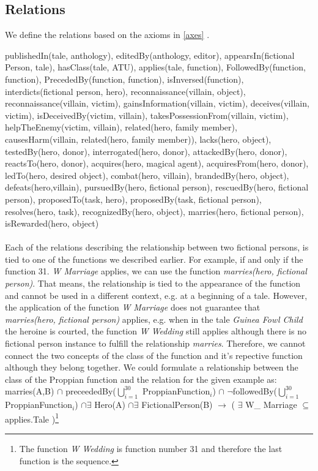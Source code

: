 \documentclass[10pt,a4paper]{article}
\begin{document}
\subsection{Relations}
We define the relations based on the axioms in \ref{axes} . 

publishedIn(tale, anthology), editedBy(anthology, editor), appearsIn(fictional Person, tale), hasClass(tale, ATU), applies(tale, function), FollowedBy(function, function), PrecededBy(function, function), isInversed(function), interdicts(fictional person, hero), reconnaissance(villain, object), reconnaissance(villain, victim), gainsInformation(villain, victim), deceives(villain, victim), isDeceivedBy(victim, villain), takesPossessionFrom(villain, victim), helpTheEnemy(victim, villain), related(hero, family member), causesHarm(villain, related(hero, family member)), lacks(hero, object), testedBy(hero, donor), interrogated(hero, donor), attackedBy(hero, donor), reactsTo(hero, donor), acquires(hero, magical agent), acquiresFrom(hero, donor), ledTo(hero, desired object), combat(hero, villain), brandedBy(hero, object), defeats(hero,villain), pursuedBy(hero, fictional person), rescuedBy(hero, fictional person), proposedTo(task, hero), proposedBy(task, fictional person), resolves(hero, task), recognizedBy(hero, object), marries(hero, fictional person), isRewarded(hero, object)
\\ \\
Each of the relations describing the relationship between two fictional persons, is tied to one of the functions we described earlier. For example, if and only if the function 31. \textit{W Marriage} applies, we can use the function \textit{marries(hero, fictional person)}. That means, the relationship is tied to the appearance of the function and cannot be used in a different context, e.g. at a beginning of a tale. 
However, the application of the function \textit{W Marriage} does not guarantee that \textit{marries(hero, fictional person)} applies, e.g. when in the tale \textit{Guinea Fowl Child} the heroine is courted, the function \textit{W Wedding} still applies although there is no fictional person instance to fulfill the relationship \textit{marries}. Therefore, we cannot connect the two concepts of the class of the function and it's repective function although they belong together.   
\newpage
We could formulate a relationship between the class of the Proppian function and the relation for the given example as: \\
\label{Rel}
\small
marries(A,B) $\cap$ preceededBy($\bigcup\limits_{i=1}^{30}$ ProppianFunction$_{i}$)  $\cap$ $\neg$followedBy($\bigcup\limits_{i=1}^{30}$ ProppianFunction$_{i}$)
$\cap \exists $ Hero(A) $\cap \exists$ FictionalPerson(B) $\rightarrow$ ( $\exists$ W\_ Marriage $\subseteq$ applies.Tale )\footnote{The function \textit{W Wedding} is function number 31 and therefore the last function is the sequence.} \\
\end{document}
